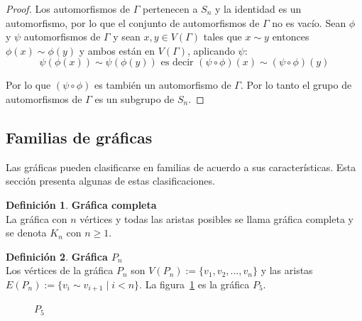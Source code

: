 \documentclass[12pt]{book}
\theoremstyle{definition}
\newtheorem{definition}{Definición}
\begin{document}
\begin{proof} Los automorfismos de $\Gamma$ pertenecen a $S_n$
  y la identidad es un automorfismo, por lo que el conjunto de
  automorfismos de $\Gamma$ no es vacío. Sean $\phi$ y $\psi$
  automorfismos de $\Gamma$ y sean $x,y\in V(\Gamma)$ tales que $x\sim
  y$ entonces $\phi(x)\sim \phi(y)$ y ambos están en $V(\Gamma)$,
  aplicando $\psi$:
\begin{equation*}
  \psi(\phi(x))\sim \psi(\phi(y))
  \mbox{ es decir } 
  (\psi \circ \phi) (x)\sim (\psi \circ \phi)(y)
\end{equation*}

Por lo que $(\psi \circ \phi)$ es también un automorfismo de
$\Gamma$. Por lo tanto el grupo de automorfismos de $\Gamma$ es un
subgrupo de $S_n$.
\end{proof}

\subsection{Familias de gráficas}

Las gráficas pueden clasificarse en familias de acuerdo a sus
características. Esta sección presenta algunas de estas
clasificaciones.

\begin{definition}\textbf{Gráfica completa}\\
  La gráfica con $n$ vértices y todas las aristas posibles se llama
  gráfica completa y se denota $K_n$ con $n\geq 1$.
\end{definition}

\begin{definition}\textbf{Gráfica $P_n$}\\
  Los vértices de la gráfica $P_n$ son $V(P_n):=\{v_1,v_2,...,v_n\}$ y
  las aristas $E(P_n):=\{v_i \sim v_{i+1} \mid i<n\}$. La
  figura~\ref{P5} es la gráfica $P_5$.
\end{definition}


\begin{figure}
  \centering
  \caption{$P_5$} \label{P5}
\end{figure}
\end{document}
